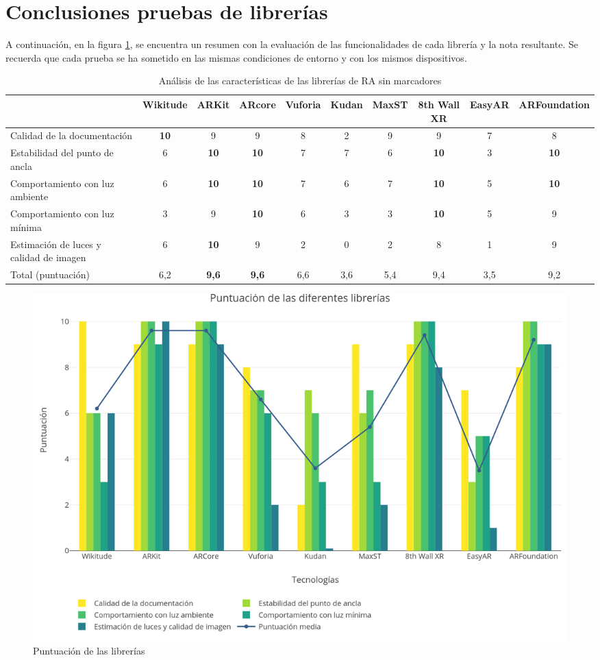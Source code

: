 \section{Conclusiones pruebas de librerías}
A continuación, en la figura \ref{tab:libanalisisl}, se encuentra un resumen con la evaluación de las funcionalidades de cada librería y la nota resultante. Se recuerda que cada prueba se ha sometido en las mismas condiciones de entorno y con los mismos dispositivos.
\begin{table}[H]
\resizebox{\textwidth}{!} {
    \centering
    \begin{tabular}{m{3cm} c c c c c c c c c}
    \toprule
    &Wikitude&	ARKit &	ARcore & Vuforia & Kudan &	MaxST  & 8th Wall XR & EasyAR & ARFoundation\\
     \midrule
         Calidad de la documentación 	& \textbf{10} & 9 & 9 & 8 &2 & 9 & 9 &  7 & 8 \\
  
Estabilidad del punto de ancla 		& 6 & \textbf{10} & \textbf{10} & 7 & 7 & 6 &  \textbf{10}  & 3 & \textbf{10} \\
 
Comportamiento con luz ambiente   & 6 & \textbf{10} & \textbf{10}& 7 & 6 & 7 & \textbf{10}  & 5 & \textbf{10}\\
 
Comportamiento con luz mínima     & 3 &  9 & \textbf{10} & 6 & 3 & 3& \textbf{10} & 5 & 9\\
 
Estimación de luces y calidad de imagen & 6 & \textbf{10} & 9 & 2  & 0  & 2 & 8 & 1 &9\\
 
Total (puntuación) & 6,2 & \textbf{9,6} & \textbf{9,6}  & 6,6 &    3,6   &   5,4     &  9,4     &     3,5        &  9,2          \\
\bottomrule
    \end{tabular}
}
    \caption{Análisis de las características de las librerías de RA sin marcadores}
    \label{tab:libanalisisl}
\end{table}

\begin{figure}[H]
    \centering
    \includegraphics[width=\linewidth]{Images/Puntuacion_librerias.png}
    \caption{Puntuación de las librerías}
    \label{PuntuacionGraph}
\end{figure}

